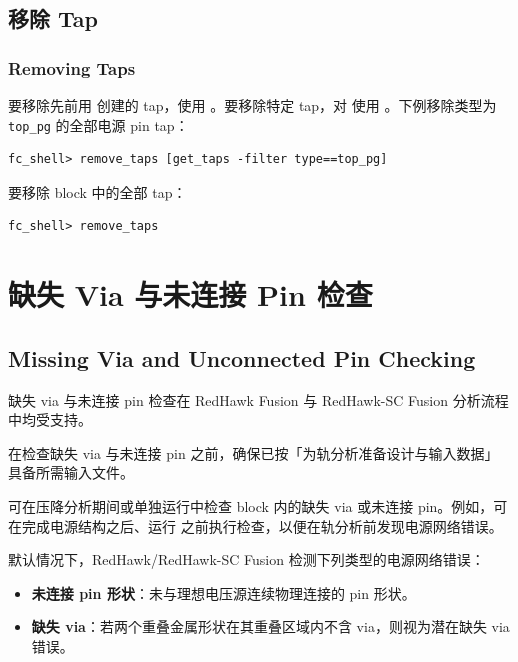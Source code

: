 \subsection{移除 Tap}
\subsubsection*{Removing Taps}

要移除先前用  创建的 tap，使用 。要移除特定 tap，对  使用 。下例移除类型为 \texttt{top\_pg} 的全部电源 pin tap：
\begin{lstlisting}
fc_shell> remove_taps [get_taps -filter type==top_pg]
\end{lstlisting}

要移除 block 中的全部 tap：
\begin{lstlisting}
fc_shell> remove_taps
\end{lstlisting}

\section{缺失 Via 与未连接 Pin 检查}
\subsection*{Missing Via and Unconnected Pin Checking}

\begin{noteBox}
缺失 via 与未连接 pin 检查在 RedHawk Fusion 与 RedHawk-SC Fusion 分析流程中均受支持。
\end{noteBox}

在检查缺失 via 与未连接 pin 之前，确保已按「为轨分析准备设计与输入数据」具备所需输入文件。

可在压降分析期间或单独运行中检查 block 内的缺失 via 或未连接 pin。例如，可在完成电源结构之后、运行  之前执行检查，以便在轨分析前发现电源网络错误。

默认情况下，RedHawk/RedHawk-SC Fusion 检测下列类型的电源网络错误：
\begin{itemize}
  \item \textbf{未连接 pin 形状}：未与理想电压源连续物理连接的 pin 形状。
  \item \textbf{缺失 via}：若两个重叠金属形状在其重叠区域内不含 via，则视为潜在缺失 via 错误。
\end{itemize}

